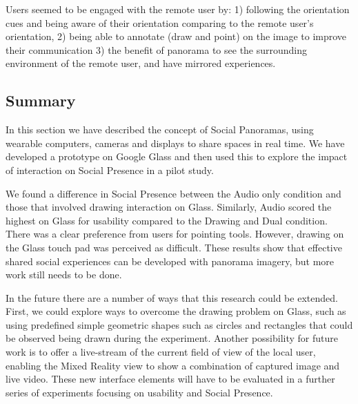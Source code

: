 Users seemed to be engaged with the remote user by: 1) following the orientation cues and being aware of their orientation comparing to the remote user's orientation, 2) being able to annotate (draw and point) on the image to improve their communication 3) the benefit of panorama to see the surrounding environment of the remote user, and have mirrored experiences.


\subsection{Summary}

In this section we have described the concept of Social Panoramas, using wearable computers, cameras and displays to share spaces in real time. We have developed a prototype on Google Glass and then used this to explore the impact of interaction on Social Presence in a pilot study. 

We found a difference in Social Presence between the Audio only condition and those that involved drawing interaction on Glass. Similarly, Audio scored the highest on Glass for usability compared to the Drawing and Dual condition. There was a clear preference from users for pointing tools. However, drawing on the Glass touch pad was perceived as difficult. These results show that effective shared social experiences can be developed with panorama imagery, but more work still needs to be done.

In the future there are a number of ways that this research could be extended. First, we could explore ways to overcome the drawing problem on Glass, such as using predefined simple geometric shapes such as circles and rectangles that could be observed being drawn during the experiment. Another possibility for future work is to offer a live-stream of the current field of view of the local user, enabling the Mixed Reality view to show a combination of captured image and live video. These new interface elements will have to be evaluated in a further series of experiments focusing on usability and Social Presence.

